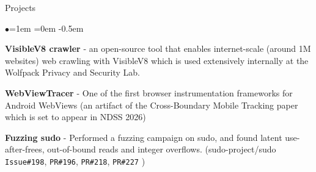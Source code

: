 \documentclass{resume} %
\begin{document}
\begin{rSection}{Projects}
\begin{list}{$\bullet$}{\leftmargin=1em \itemindent=0em}
\itemsep -0.5em
\item {\bf VisibleV8 crawler} - an open-source tool that enables internet-scale (around 1M websites) web crawling with VisibleV8 which is used extensively internally at the Wolfpack Privacy and Security Lab.
\item {\bf WebViewTracer} - One of the first browser instrumentation frameworks for Android WebViews (an artifact of the Cross-Boundary Mobile Tracking paper which is set to appear in NDSS 2026)
\item {\bf Fuzzing sudo} - Performed a fuzzing campaign on sudo, and found latent use-after-frees, out-of-bound reads and integer overflows. (sudo-project/sudo \texttt{Issue\#198}, \texttt{PR\#196}, \texttt{PR\#218}, \texttt{PR\#227} )
\end{list}
\end{rSection}
\end{document}
